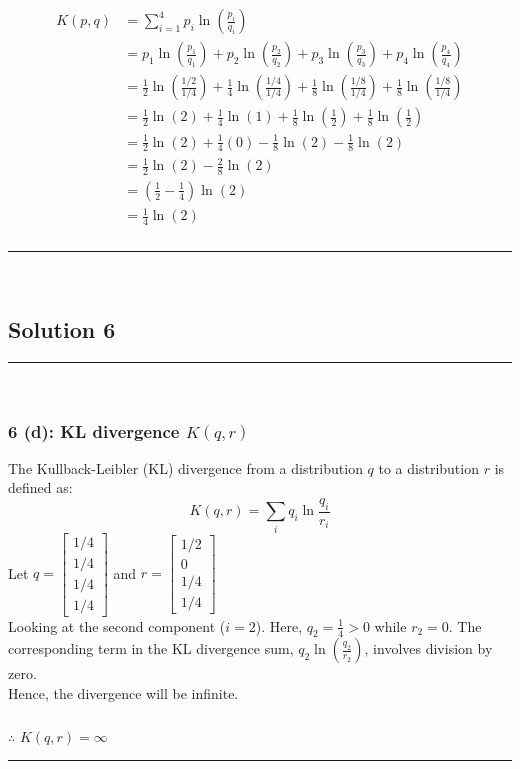 \documentclass{article}
\begin{document}
\begin{align*}
K(p, q) &= \sum_{i=1}^{4} p_i \ln\left(\frac{p_i}{q_i}\right) \\
&= p_1 \ln\left(\frac{p_1}{q_1}\right) + p_2 \ln\left(\frac{p_2}{q_2}\right) + p_3 \ln\left(\frac{p_3}{q_3}\right) + p_4 \ln\left(\frac{p_4}{q_4}\right) \\
&= \frac{1}{2}\ln\left(\frac{1/2}{1/4}\right) + \frac{1}{4}\ln\left(\frac{1/4}{1/4}\right) + \frac{1}{8}\ln\left(\frac{1/8}{1/4}\right) + \frac{1}{8}\ln\left(\frac{1/8}{1/4}\right) \\
&= \frac{1}{2}\ln(2) + \frac{1}{4}\ln(1) + \frac{1}{8}\ln\left(\frac{1}{2}\right) + \frac{1}{8}\ln\left(\frac{1}{2}\right) \\
&= \frac{1}{2}\ln(2) + \frac{1}{4}(0) - \frac{1}{8}\ln(2) - \frac{1}{8}\ln(2) \\
&= \frac{1}{2}\ln(2) - \frac{2}{8}\ln(2) \\
&= \left(\frac{1}{2} - \frac{1}{4}\right)\ln(2) \\
&= \frac{1}{4}\ln(2)
\end{align*}

\subsubsection*{}
\noindent\rule{\textwidth}{0.4pt}\\

\newpage

\subsection*{Solution 6}
\noindent\rule{\textwidth}{0.4pt}\\

\subsubsection*{6 (d): KL divergence $K(q, r)$}
\parbox{\textwidth}{
The Kullback-Leibler (KL) divergence from a distribution $q$ to a distribution $r$ is defined as:
$$K(q, r) = \sum_{i} q_i \ln \frac{q_i}{r_i}$$
Let $q = \begin{bmatrix} 1/4 \\ 1/4 \\ 1/4 \\ 1/4 \end{bmatrix}$ and $r = \begin{bmatrix} 1/2 \\ 0 \\ 1/4 \\ 1/4 \end{bmatrix}$ \\

Looking at the second component ($i=2$). Here, $q_2 = \frac{1}{4} > 0$ while $r_2 = 0$. The corresponding term in the KL divergence sum, $q_2 \ln\left(\frac{q_2}{r_2}\right)$, involves division by zero. \\

Hence, the divergence will be infinite.
}
\subsubsection*{\normalfont}{$\therefore$ $K(q, r) = \infty$}

\noindent\rule{\textwidth}{0.4pt}\\

\newpage
\end{document}

